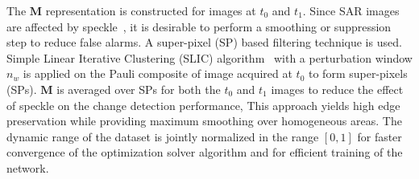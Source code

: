 The $\mathbf{M}$ representation is constructed for images at $t_0$ and $t_1$.
Since SAR images are affected by speckle~\cite{lee1994speckle}, it is desirable to perform a smoothing or suppression step to reduce false alarms. A super-pixel (SP) based filtering technique is used. Simple Linear Iterative Clustering (SLIC) algorithm~\cite{6205760} with a perturbation window $n_w$ is applied on the Pauli composite of image acquired at $t_0$ to form super-pixels (SPs).  $\mathbf{M}$ is  averaged over SPs for both the $t_0$ and $t_1$ images to reduce the effect of speckle on the  change detection performance, This approach yields high edge preservation while providing maximum smoothing over homogeneous areas. 
The dynamic range of the dataset is  jointly normalized in the range $[0,1]$ for faster convergence of the optimization solver algorithm and  for efficient training of the network. 
 



